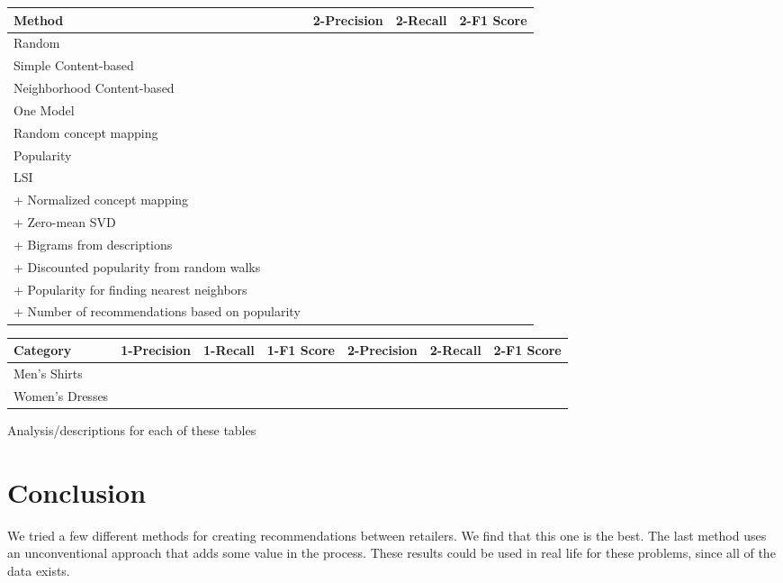 \documentclass[11pt]{article}
\begin{document}
\begin{center}
\begin{tabular}{ | l | c | c | c |}
\hline
Method & 2-Precision & 2-Recall & 2-F1 Score \\ \hline\hline
Random &&&\\ \hline
Simple Content-based &&&\\ \hline
Neighborhood Content-based &&&\\ \hline
One Model &&&\\ \hline
Random concept mapping &&&\\ \hline
Popularity &&&\\ \hline
LSI &&&\\ \hline
\hspace*{0.5cm} + Normalized concept mapping &&&\\ \hline
\hspace*{0.5cm} + Zero-mean SVD &&&\\ \hline
\hspace*{0.5cm} + Bigrams from descriptions &&&\\ \hline
\hspace*{0.5cm} + Discounted popularity from random walks &&&\\ \hline
\hspace*{0.5cm} + Popularity for finding nearest neighbors &&&\\ \hline
\hspace*{0.5cm} + Number of recommendations based on popularity &&&\\ \hline

\end{tabular}
\end{center}

\begin{center}
\begin{tabular}{ | l | c | c | c | c | c | c |}
\hline
Category & 1-Precision & 1-Recall & 1-F1 Score & 2-Precision & 2-Recall & 2-F1 Score \\ \hline\hline
Men's Shirts &&&&&&\\ \hline
Women's Dresses &&&&&&\\ \hline
\end{tabular}
\end{center}

Analysis/descriptions for each of these tables

\section*{Conclusion}
We tried a few different methods for creating recommendations between
retailers. We find that this one is the best.
The last method uses an unconventional approach that adds some value in the
process. These results could be used in real life for these problems, since all
of the data exists.
\end{document}
